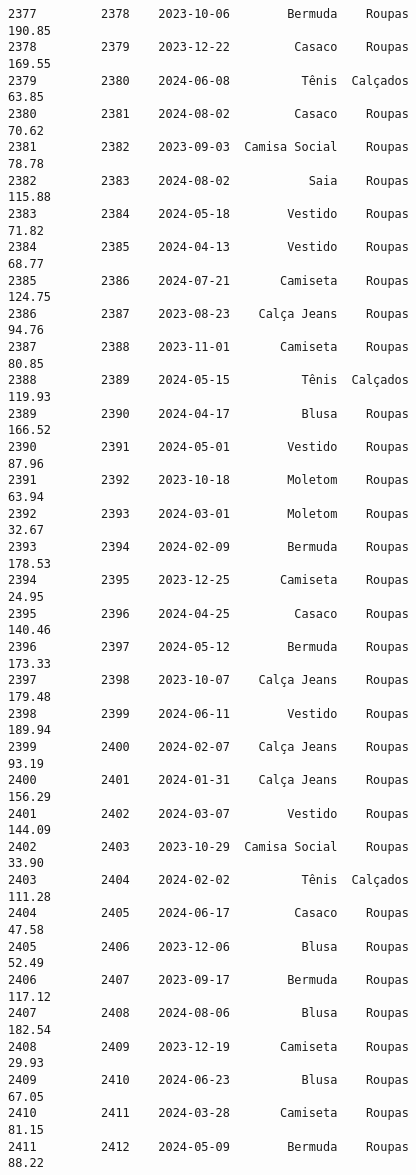 \documentclass[11pt]{article}
\begin{document}
\begin{Verbatim}[commandchars=\\\{\}]
2377         2378    2023-10-06        Bermuda    Roupas          190.85   
2378         2379    2023-12-22         Casaco    Roupas          169.55   
2379         2380    2024-06-08          Tênis  Calçados           63.85   
2380         2381    2024-08-02         Casaco    Roupas           70.62   
2381         2382    2023-09-03  Camisa Social    Roupas           78.78   
2382         2383    2024-08-02           Saia    Roupas          115.88   
2383         2384    2024-05-18        Vestido    Roupas           71.82   
2384         2385    2024-04-13        Vestido    Roupas           68.77   
2385         2386    2024-07-21       Camiseta    Roupas          124.75   
2386         2387    2023-08-23    Calça Jeans    Roupas           94.76   
2387         2388    2023-11-01       Camiseta    Roupas           80.85   
2388         2389    2024-05-15          Tênis  Calçados          119.93   
2389         2390    2024-04-17          Blusa    Roupas          166.52   
2390         2391    2024-05-01        Vestido    Roupas           87.96   
2391         2392    2023-10-18        Moletom    Roupas           63.94   
2392         2393    2024-03-01        Moletom    Roupas           32.67   
2393         2394    2024-02-09        Bermuda    Roupas          178.53   
2394         2395    2023-12-25       Camiseta    Roupas           24.95   
2395         2396    2024-04-25         Casaco    Roupas          140.46   
2396         2397    2024-05-12        Bermuda    Roupas          173.33   
2397         2398    2023-10-07    Calça Jeans    Roupas          179.48   
2398         2399    2024-06-11        Vestido    Roupas          189.94   
2399         2400    2024-02-07    Calça Jeans    Roupas           93.19   
2400         2401    2024-01-31    Calça Jeans    Roupas          156.29   
2401         2402    2024-03-07        Vestido    Roupas          144.09   
2402         2403    2023-10-29  Camisa Social    Roupas           33.90   
2403         2404    2024-02-02          Tênis  Calçados          111.28   
2404         2405    2024-06-17         Casaco    Roupas           47.58   
2405         2406    2023-12-06          Blusa    Roupas           52.49   
2406         2407    2023-09-17        Bermuda    Roupas          117.12   
2407         2408    2024-08-06          Blusa    Roupas          182.54   
2408         2409    2023-12-19       Camiseta    Roupas           29.93   
2409         2410    2024-06-23          Blusa    Roupas           67.05   
2410         2411    2024-03-28       Camiseta    Roupas           81.15   
2411         2412    2024-05-09        Bermuda    Roupas           88.22   

\end{Verbatim}
\end{document}
